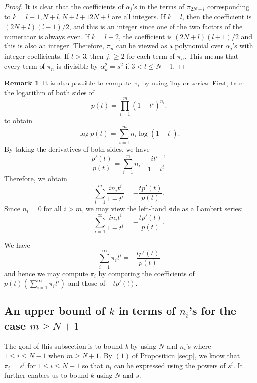 \documentclass[reqno]{amsart}
\numberwithin{equation}{section}
\theoremstyle{plain}
\theoremstyle{definition}
\newtheorem{rem}[equation]{Remark}
\begin{document}
\begin{proof}
It is clear that the coefficients of $\alpha_j$'s in the terms of $\pi_{2N+l}$ corresponding to $k=l+1, N+l, N+l+1 2N+l$ are all integers. If $k=l$, then the coefficient is $(2N+l)(l-1)/2$, and this is an integer since one of the two factors of the numerator is always even. If $k=l+2$, the coefficient is $(2N+l)(l+1)/2$ and this is also an integer. Therefore, $\pi_{n}$ can be viewed as a polynomial over $\alpha_j$'s with integer coefficients. If $l>3$, then $j_1\geq 2$ for each term of $\pi_n$. This means that every term of $\pi_n$ is divisible by $\alpha_k^2=s^2$ if $3<l\leq N-1$.  \end{proof}

\begin{rem}
    It is also possible to compute $\pi_i$ by using Taylor series. First, take the logarithm of both sides of 
$$p(t)=\prod^m_{i=1}(1-t^i)^{n_i}.$$
to obtain
$$\log p(t)=\sum^m_{i=1}n_i\log(1-t^i).$$
By taking the derivatives of both sides, we have
$$\frac{p'(t)}{p(t)}=\sum^m_{i=1} n_i\cdot\frac{-it^{i-1}}{1-t^i}$$
Therefore, we obtain
$$\sum^m_{i=1}\frac{in_it^i}{1-t^i}=-\frac{tp'(t)}{p(t)}.$$
Since $n_i=0$ for all $i>m$, we may view the left-hand side as a Lambert series:
$$\sum^\infty_{i=1}\frac{in_it^i}{1-t^i}=-\frac{tp'(t)}{p(t)}.$$

We have
$$\sum^\infty_{i=1}\pi_it^i=-\frac{tp'(t)}{p(t)}$$
and hence we may compute $\pi_i$ by comparing the coefficients of $p(t)(\sum^\infty_{i=1}\pi_it^i)$ and those of $-tp'(t)$.
\end{rem}

\subsection{An upper bound of $k$ in terms of $n_i$'s for the case $m\geq N+1$}

The goal of this subsection is to bound $k$ by using $N$ and $n_i$'s where $1\leq i\leq N-1$ when $m\geq N+1$. By $(1)$ of Proposition \ref{seqp}, we know that $\pi_i=s^i$ for $1\leq i\leq N-1$ so that $n_i$ can be expressed using the powers of $s^i$. It further enables us to bound $k$ using $N$ and $s$.
\end{document}
